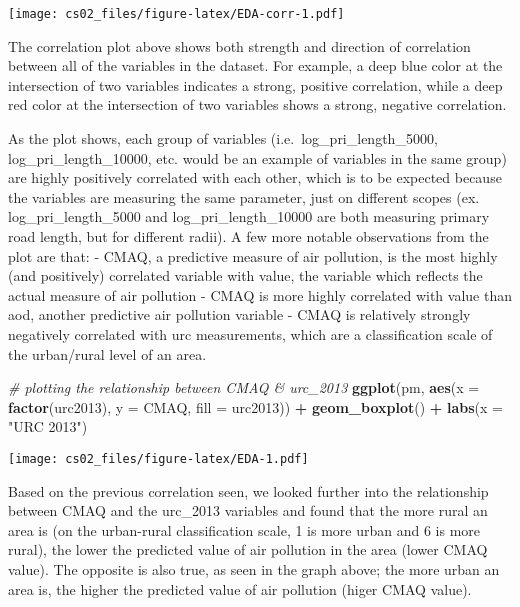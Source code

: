 \documentclass[
]{article}
\newenvironment{Shaded}{\begin{snugshade}}{\end{snugshade}}
\newcommand{\AttributeTok}[1]{\textcolor[rgb]{0.13,0.29,0.53}{#1}}
\newcommand{\CommentTok}[1]{\textcolor[rgb]{0.56,0.35,0.01}{\textit{#1}}}
\newcommand{\FunctionTok}[1]{\textcolor[rgb]{0.13,0.29,0.53}{\textbf{#1}}}
\newcommand{\NormalTok}[1]{#1}
\newcommand{\SpecialCharTok}[1]{\textcolor[rgb]{0.81,0.36,0.00}{\textbf{#1}}}
\newcommand{\StringTok}[1]{\textcolor[rgb]{0.31,0.60,0.02}{#1}}
\begin{document}
\texttt{[image: cs02\_files/figure-latex/EDA-corr-1.pdf]}

The correlation plot above shows both strength and direction of
correlation between all of the variables in the dataset. For example, a
deep blue color at the intersection of two variables indicates a strong,
positive correlation, while a deep red color at the intersection of two
variables shows a strong, negative correlation.

As the plot shows, each group of variables (i.e.~log\_pri\_length\_5000,
log\_pri\_length\_10000, etc. would be an example of variables in the
same group) are highly positively correlated with each other, which is
to be expected because the variables are measuring the same parameter,
just on different scopes (ex. log\_pri\_length\_5000 and
log\_pri\_length\_10000 are both measuring primary road length, but for
different radii). A few more notable observations from the plot are
that: - CMAQ, a predictive measure of air pollution, is the most highly
(and positively) correlated variable with value, the variable which
reflects the actual measure of air pollution - CMAQ is more highly
correlated with value than aod, another predictive air pollution
variable - CMAQ is relatively strongly negatively correlated with urc
measurements, which are a classification scale of the urban/rural level
of an area.

\begin{Shaded}
\begin{Highlighting}[]
\CommentTok{\# plotting the relationship between CMAQ \& urc\_2013}
\FunctionTok{ggplot}\NormalTok{(pm, }\FunctionTok{aes}\NormalTok{(}\AttributeTok{x =} \FunctionTok{factor}\NormalTok{(urc2013), }\AttributeTok{y =}\NormalTok{ CMAQ, }\AttributeTok{fill =}\NormalTok{ urc2013)) }\SpecialCharTok{+} 
  \FunctionTok{geom\_boxplot}\NormalTok{() }\SpecialCharTok{+}
  \FunctionTok{labs}\NormalTok{(}\AttributeTok{x =} \StringTok{"URC 2013"}\NormalTok{)}
\end{Highlighting}
\end{Shaded}

\texttt{[image: cs02\_files/figure-latex/EDA-1.pdf]}

Based on the previous correlation seen, we looked further into the
relationship between CMAQ and the urc\_2013 variables and found that the
more rural an area is (on the urban-rural classification scale, 1 is
more urban and 6 is more rural), the lower the predicted value of air
pollution in the area (lower CMAQ value). The opposite is also true, as
seen in the graph above; the more urban an area is, the higher the
predicted value of air pollution (higer CMAQ value).
\end{document}
